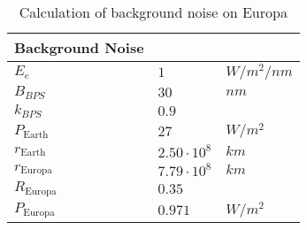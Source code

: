 \begin{table}[H]
\centering
\caption{Calculation of background noise on Europa}
\label{tab:background_noise}
\begin{tabular}{|l|ll|} \hline
\textbf{Background Noise} &          &         \\ \hline
$E_e               $       & $1$        & $W/m^2/nm$ \\
$B_{BPS}             $       & $30$       & $nm$     \\
$k_{BPS}             $       & $0.9$      &         \\
$P_{\text{Earth}}           $       & $27 $      & $W/m^2$    \\ \hline
$r_{\text{Earth}}           $       & $2.50\cdot10^8$ & $km$      \\
$r_{\text{Europa}}          $       & $7.79\cdot10^8$ & $km$      \\
$R_{\text{Europa}}         $       & $0.35$     &         \\
$P_{\text{Europa}}          $       & $0.971$ & $W/m^2$    \\ \hline
\end{tabular}
\end{table}